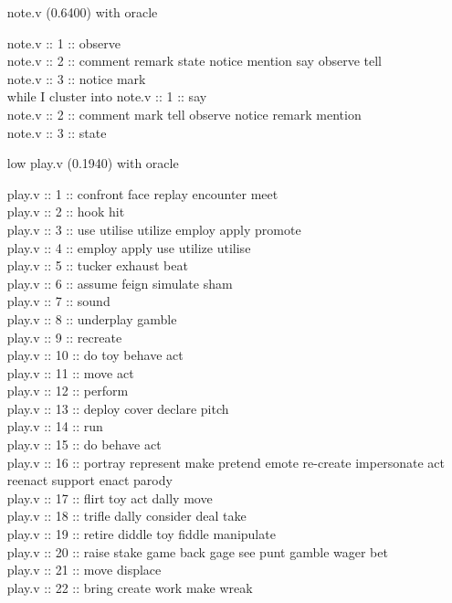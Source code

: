 \documentclass[12pt]{article}
\begin{document}
\begin{itemize}
	note.v (0.6400) with oracle
	
	note.v :: 1 :: observe \\
	note.v :: 2 :: comment remark state notice mention say observe tell \\
	note.v :: 3 :: notice mark \\
	
	
	while I cluster into
	note.v :: 1 :: say \\
	note.v :: 2 :: comment mark tell observe notice remark mention \\
	note.v :: 3 :: state \\
	
	\item[low]
	play.v (0.1940) with oracle 

	play.v :: 1 :: confront face replay encounter meet \\
	play.v :: 2 :: hook hit \\
	play.v :: 3 :: use utilise utilize employ apply promote \\
	play.v :: 4 :: employ apply use utilize utilise \\
	play.v :: 5 :: tucker exhaust beat \\
	play.v :: 6 :: assume feign simulate sham \\
	play.v :: 7 :: sound \\
	play.v :: 8 :: underplay gamble \\
	play.v :: 9 :: recreate \\
	play.v :: 10 :: do toy behave act \\
	play.v :: 11 :: move act \\ 
	play.v :: 12 :: perform \\
	play.v :: 13 :: deploy cover declare pitch \\
	play.v :: 14 :: run\\
	play.v :: 15 :: do behave act \\
	play.v :: 16 :: portray represent make pretend emote re-create impersonate act reenact support enact parody \\
	play.v :: 17 :: flirt toy act dally move \\
	play.v :: 18 :: trifle dally consider deal take \\
	play.v :: 19 :: retire diddle toy fiddle manipulate \\
	play.v :: 20 :: raise stake game back gage see punt gamble wager bet \\
	play.v :: 21 :: move displace \\
	play.v :: 22 :: bring create work make wreak \\

\end{itemize}
\end{document}
